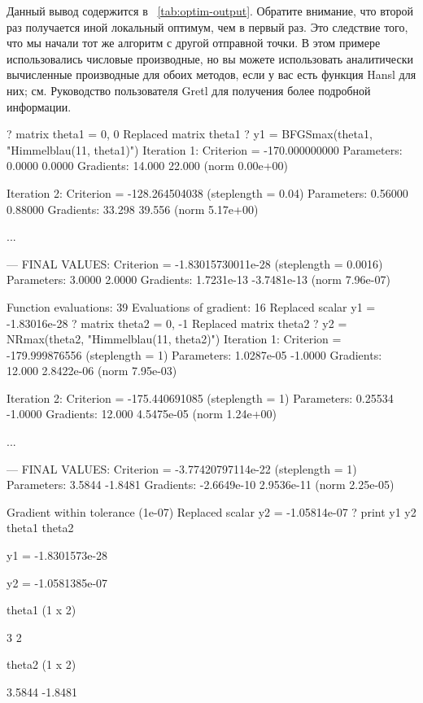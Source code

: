 Данный вывод содержится в ~\ref{tab:optim-output}. Обратите внимание,
что второй раз получается иной локальный оптимум, чем в первый
раз. Это следствие того, что мы начали тот же алгоритм с другой
отправной точки. В этом примере использовались числовые производные,
но вы можете использовать аналитически вычисленные производные для
обоих методов, если у вас есть функция Hansl для них; см. Руководство
пользователя Gretl для получения более подробной информации.

\begin{table}[ht]
  \begin{footnotesize}
\begin{scode}
? matrix theta1 = { 0, 0 }
Replaced matrix theta1
? y1 = BFGSmax(theta1, "Himmelblau(11, theta1)")
Iteration 1: Criterion = -170.000000000
Parameters:       0.0000      0.0000
Gradients:        14.000      22.000 (norm 0.00e+00)

Iteration 2: Criterion = -128.264504038 (steplength = 0.04)
Parameters:      0.56000     0.88000
Gradients:        33.298      39.556 (norm 5.17e+00)

...

--- FINAL VALUES: 
Criterion = -1.83015730011e-28 (steplength = 0.0016)
Parameters:       3.0000      2.0000
Gradients:    1.7231e-13 -3.7481e-13 (norm 7.96e-07)

Function evaluations: 39
Evaluations of gradient: 16
Replaced scalar y1 = -1.83016e-28
? matrix theta2 = { 0, -1 }
Replaced matrix theta2
? y2 = NRmax(theta2, "Himmelblau(11, theta2)")
Iteration 1: Criterion = -179.999876556 (steplength = 1)
Parameters:   1.0287e-05     -1.0000
Gradients:        12.000  2.8422e-06 (norm 7.95e-03)

Iteration 2: Criterion = -175.440691085 (steplength = 1)
Parameters:      0.25534     -1.0000
Gradients:        12.000  4.5475e-05 (norm 1.24e+00)

...

--- FINAL VALUES: 
Criterion = -3.77420797114e-22 (steplength = 1)
Parameters:       3.5844     -1.8481
Gradients:   -2.6649e-10  2.9536e-11 (norm 2.25e-05)

Gradient within tolerance (1e-07)
Replaced scalar y2 = -1.05814e-07
? print y1 y2 theta1 theta2

             y1 = -1.8301573e-28

             y2 = -1.0581385e-07

theta1 (1 x 2)

  3   2 

theta2 (1 x 2)

      3.5844      -1.8481 
\end{scode}
    
  \end{footnotesize}
  \caption{Результат максимизации}
  \label{tab:optim-output}
\end{table}
